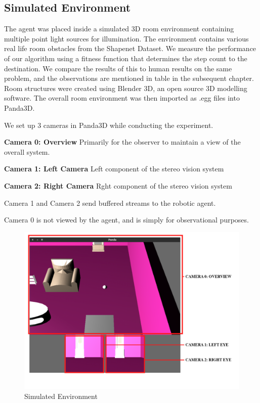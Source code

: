 \subsection{Simulated Environment}
The agent was placed inside a simulated 3D room environment containing multiple point light sources for illumination. The environment contains various real life room obstacles from the Shapenet Dataset.
We measure the performance of our algorithm using a fitness function that determines the step count to the destination. We compare the results of this to human results on the same problem, and the observations are mentioned in table in the subsequent chapter.
Room structures were created using Blender 3D, an open source 3D modelling software. The overall room environment was then imported as .egg files into Panda3D.

We set up 3 cameras in Panda3D while conducting the experiment.
 
\textbf{Camera 0: Overview} 
Primarily for the observer to maintain a view of the overall system.

\textbf{Camera 1: Left Camera}
Left component of the stereo vision system

\textbf{Camera 2: Right Camera}
Rght component of the stereo vision system

Camera 1 and Camera 2 send buffered streams to the robotic agent. 

Camera 0 is not viewed by the agent, and is simply for observational purposes.

\begin{figure}
  \includegraphics[width=\linewidth]{images/godview.png}
  \caption{Simulated Environment}
  \label{fig:boat1}
\end{figure}